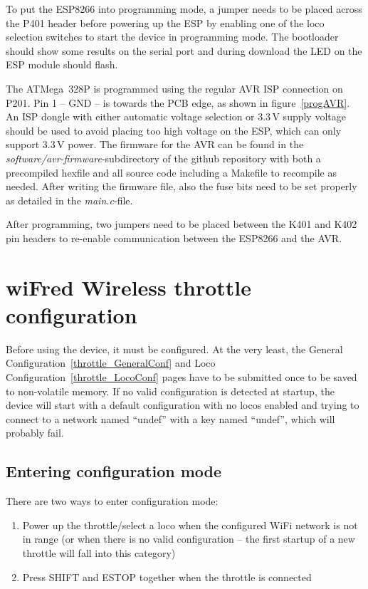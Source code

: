 \documentclass[11pt,a4paper]{scrartcl}
\begin{document}
To put the ESP8266 into programming mode, a jumper needs to be placed across the P401 header before powering up the ESP by enabling one of the loco selection switches to start the device in programming mode. The bootloader should show some results on the serial port and during download the LED on the ESP module should flash.

The ATMega~328P is programmed using the regular AVR ISP connection on P201. Pin 1 -- GND -- is towards the PCB edge, as shown in figure~\ref{progAVR}. An ISP dongle with either automatic voltage selection or 3.3\,V supply voltage should be used to avoid placing too high voltage on the ESP, which can only support 3.3\,V power. The firmware for the AVR can be found in the \textit{software/avr-firmware}-subdirectory of the github repository with both a precompiled hexfile and all source code including a Makefile to recompile as needed. After writing the firmware file, also the fuse bits need to be set properly as detailed in the \textit{main.c}-file.

After programming, two jumpers need to be placed between the K401 and K402 pin headers to re-enable communication between the ESP8266 and the AVR.

\clearpage

\section{wiFred Wireless throttle configuration} \label{config}

Before using the device, it must be configured. At the very least, the General Configuration~\ref{throttle_GeneralConf} and Loco Configuration~\ref{throttle_LocoConf} pages have to be submitted once to be saved to non-volatile memory. If no valid configuration is detected at startup, the device will start with a default configuration with no locos enabled and trying to connect to a network named ``undef'' with a key named ``undef'', which will probably fail.

\subsection{Entering configuration mode}

There are two ways to enter configuration mode:

\begin{enumerate}
\item Power up the throttle/select a loco when the configured WiFi network is not in range (or when there is no valid configuration -- the first startup of a new throttle will fall into this category)
\item Press SHIFT and ESTOP together when the throttle is connected
\end{enumerate}
\end{document}
